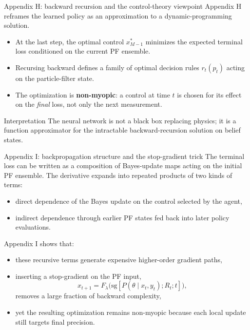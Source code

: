 \documentclass[aspectratio=169]{beamer}
\begin{document}
\begin{frame}{Appendix H: backward recursion and the control-theory viewpoint}
Appendix H reframes the learned policy as an approximation to a dynamic-programming solution.
\vspace{0.4em}
\begin{itemize}
  \item At the last step, the optimal control $x^*_{M-1}$ minimizes the expected terminal loss conditioned on the current PF ensemble.
  \item Recursing backward defines a family of optimal decision rules $r_t(p_t)$ acting on the particle-filter state.
  \item The optimization is \textbf{non-myopic}: a control at time $t$ is chosen for its effect on the \emph{final} loss, not only the next measurement.
\end{itemize}
\vspace{0.5em}
\begin{block}{Interpretation}
The neural network is not a black box replacing physics; it is a function approximator for the intractable backward-recursion solution on belief states.
\end{block}
\end{frame}

\begin{frame}{Appendix I: backpropagation structure and the stop-gradient trick}
The terminal loss can be written as a composition of Bayes-update maps acting on the initial PF ensemble.
\vspace{0.5em}
The derivative expands into repeated products of two kinds of terms:
\begin{itemize}
  \item direct dependence of the Bayes update on the control selected by the agent,
  \item indirect dependence through earlier PF states fed back into later policy evaluations.
\end{itemize}
\vspace{0.5em}
Appendix I shows that:
\begin{itemize}
  \item these recursive terms generate expensive higher-order gradient paths,
  \item inserting a stop-gradient on the PF input,
  \[
    x_{t+1}=F_\lambda\big(\mathrm{sg}[P(\theta\mid x_t,y_t);R_t;t]\big),
  \]
  removes a large fraction of backward complexity,
  \item yet the resulting optimization remains non-myopic because each local update still targets final precision.
\end{itemize}
\end{frame}
\end{document}
